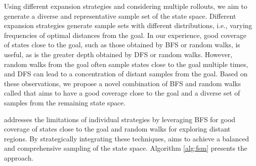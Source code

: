 Using different expansion strategies and considering multiple rollouts, we aim to generate a diverse and representative sample set of the state space. Different expansion strategies generate sample sets with different distributions, i.e., varying frequencies of optimal distances from the goal. In our experience, good coverage of states close to the goal, such as those obtained by BFS or random walks, is useful, as is the greater depth obtained by DFS or random walks. However, random walks from the goal often sample states close to the goal multiple times, and DFS can lead to a concentration of distant samples from the goal. Based on these observations, we propose a novel combination of BFS and random walks called \bfsrw that aims to have a good coverage close to the goal and a diverse set of samples from the remaining state space.

\bfsrw addresses the limitations of individual strategies by leveraging BFS for good coverage of states close to the goal and random walks for exploring distant regions. By strategically integrating these techniques, \bfsrw aims to achieve a balanced and comprehensive sampling of the state space. Algorithm \ref{alg:fsm} presents the approach.

